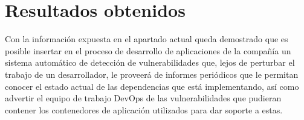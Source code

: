 \section{Resultados obtenidos}

Con la información expuesta en el apartado actual queda demostrado que es posible insertar en el proceso de desarrollo de aplicaciones de la compañía un sistema automático de detección de vulnerabilidades que, lejos de perturbar el trabajo de un desarrollador, le proveerá de informes periódicos que le permitan conocer el estado actual de las dependencias que está implementando, así como advertir el equipo de trabajo DevOps de las vulnerabilidades que pudieran contener los contenedores de aplicación utilizados para dar soporte a estas.

\endinput
